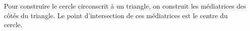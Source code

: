 Pour construire le cercle circonscrit à un triangle,
on construit les médiatrices des côtés du triangle. Le point
d'intersection de ces médiatrices est le centre du cercle.